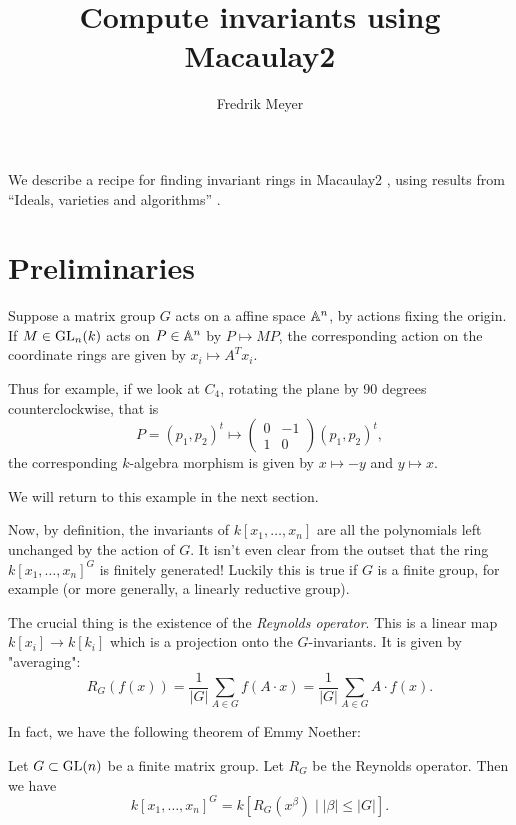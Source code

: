 \documentclass[11pt, english]{article}
\begin{document}
\title{Compute invariants using Macaulay2}
\author{Fredrik Meyer}
\maketitle 

We describe a recipe for finding invariant rings in Macaulay2 \cite{M2}, using results from ``Ideals, varieties and algorithms'' \cite{cox_ideals}.

\section{Preliminaries}

Suppose a matrix group $G$ acts on a affine space $\mathbb{A}^n$, by actions fixing the origin. If $M \in \operatorname{GL}_n(k)$ acts on $P \in \mathbb{A}^n$ by $P \mapsto MP$, the corresponding action on the coordinate rings are given by $x_i \mapsto A^T x_i$. 

Thus for example, if we look at $C_4$, rotating the plane by 90 degrees counterclockwise, that is
$$
P = (p_1,p_2)^t \mapsto \begin{pmatrix}
0 & -1 \\
1 & 0 
\end{pmatrix} (p_1,p_2)^t,
$$
the corresponding $k$-algebra morphism is given by $x \mapsto -y$ and $y \mapsto x$.

We will return to this example in the next section.

Now, by definition, the invariants of $k[x_1,\ldots,x_n]$ are all the polynomials left unchanged by the action of $G$. It isn't even clear from the outset that the ring $k[x_1,\ldots,x_n]^G$ is finitely generated! Luckily this is true if $G$ is a finite group, for example (or more generally, a linearly reductive group).

The crucial thing is the existence of the \emph{Reynolds operator}. This is a linear map $k[x_i] \to k[k_i]$ which is a projection onto the $G$-invariants. It is given by "averaging":
\begin{equation}
R_G( f(x)) = \frac{1}{\lvert G\rvert} \sum_{A \in G} f(A \cdot x) = \frac{1}{\lvert G\rvert} \sum_{A \in G} A \cdot f (x).
\end{equation}

In fact, we have the following theorem of Emmy Noether:

\begin{thm}
Let $G \subset \operatorname{GL}(n)$ be a finite matrix group. Let $R_G$ be the Reynolds operator. Then we have
$$
k[x_1,\ldots,x_n]^G = k[R_G(x^\beta) \mid \lvert \beta \rvert \leq \lvert G\rvert ].
$$
\end{thm}
\end{document}
